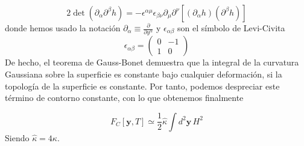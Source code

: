 \begin{equation}
2\det(\partial_{\alpha}\partial^{\beta}h)=
-\epsilon^{\alpha\mu}\epsilon_{\beta\nu}\partial_{\mu}\partial^{\nu}[(\partial_{\alpha}h)(\partial^{\beta}h)]
\end{equation}
donde hemos usado la notación $\partial_{\alpha}\equiv\frac{\partial}{\partial
  y^{\alpha}}$ y $\epsilon_{\alpha\beta}$ son el símbolo de Levi-Civita
\begin{equation}
\epsilon_{\alpha\beta}=\left(\begin{array}{cc}
0 & -1\\
1 & 0
\end{array}\right)
\end{equation}
De hecho, el teorema de Gauss-Bonet demuestra que la integral de la curvatura
Gaussiana sobre la superficie es constante bajo cualquier deformación, si la
topología de la superficie es constante. Por tanto, podemos despreciar este
término de contorno constante, con lo que obtenemos finalmente 

\begin{equation}\label{ELandau_curvatura2}
F_C[\mathbf{y},T]\simeq\frac{1}{2}\hat{\kappa}\int d^2\mathbf{y}\, H^2
\end{equation} 
Siendo $\hat{\kappa}=4\kappa$. 


